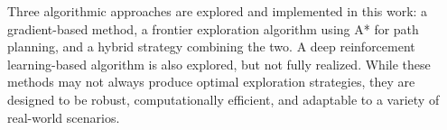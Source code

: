 Three algorithmic approaches are explored and implemented in this work: a gradient-based method, a frontier exploration algorithm using A* for path planning, and a hybrid strategy combining the two. A deep reinforcement learning-based algorithm is also explored, but not fully realized. While these methods may not always produce optimal exploration strategies, they are designed to be robust, computationally efficient, and adaptable to a variety of real-world scenarios.
